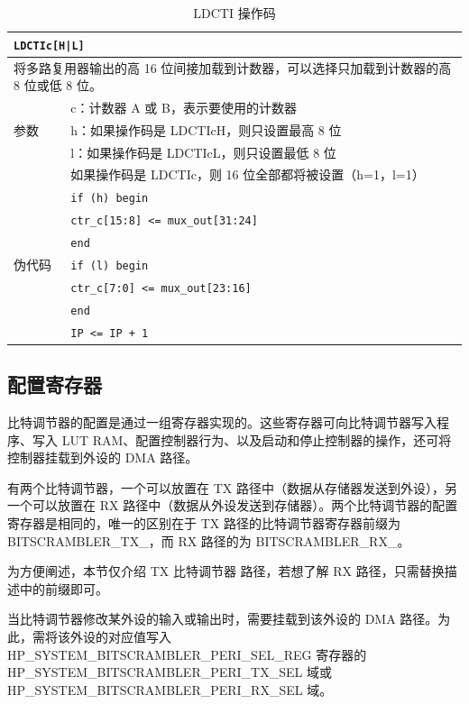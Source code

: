 \documentclass[main\_\_CN.tex]{subfiles}
\begin{document}
\begin{table}[H]
\caption{LDCTI 操作码}
\label{tab:bitscrm-ldcti-opcode}
\begin{tabular}{|l|l|}
\hline
\multicolumn{2}{|l|}{\texttt{LDCTIc[H|L]}} \\
\hline
\multicolumn{2}{|L{17cm}|}{将多路复用器输出的高 16 位间接加载到计数器，可以选择只加载到计数器的高 8 位或低 8 位。} \\
\hline
\multirow{3}{*}{参数} & c：计数器 A 或 B，表示要使用的计数器 \\
& h：如果操作码是 LDCTIcH，则只设置最高 8 位 \\
& l：如果操作码是 LDCTIcL，则只设置最低 8 位 \\
& 如果操作码是 LDCTIc，则 16 位全部都将被设置（h=1，l=1） \\
\hline
\multirow{7}{*}{伪代码} & \texttt{if (h) begin} \\
& \hspace*{4mm} \texttt{ctr\_c[15:8] <= mux\_out[31:24]} \\
& \texttt{end} \\
& \texttt{if (l) begin} \\
& \hspace*{4mm} \texttt{ctr\_c[7:0] <= mux\_out[23:16]} \\
& \texttt{end} \\
& \texttt{IP <= IP + 1} \\
\hline
\end{tabular}
\end{table}

\subsection{配置寄存器}

比特调节器的配置是通过一组寄存器实现的。这些寄存器可向比特调节器写入程序、写入 LUT RAM、配置控制器行为、以及启动和停止控制器的操作，还可将控制器挂载到外设的 DMA 路径。

\chipname{} 有两个比特调节器，一个可以放置在 TX 路径中（数据从存储器发送到外设），另一个可以放置在 RX 路径中（数据从外设发送到存储器）。两个比特调节器的配置寄存器是相同的，唯一的区别在于 TX 路径的比特调节器寄存器前缀为 BITSCRAMBLER\_TX\_，而 RX 路径的为 BITSCRAMBLER\_RX\_。

\begin{tiplisting}
为方便阐述，本节仅介绍 TX 比特调节器 路径，若想了解 RX 路径，只需替换描述中的前缀即可。
\end{tiplisting}

当比特调节器修改某外设的输入或输出时，需要挂载到该外设的 DMA 路径。为此，需将该外设的对应值写入 HP\_SYSTEM\_BITSCRAMBLER\_PERI\_SEL\_REG 寄存器的HP\_SYSTEM\_BITSCRAMBLER\_PERI\_TX\_SEL 域或 HP\_SYSTEM\_BITSCRAMBLER\_PERI\_RX\_SEL 域。
\end{document}
